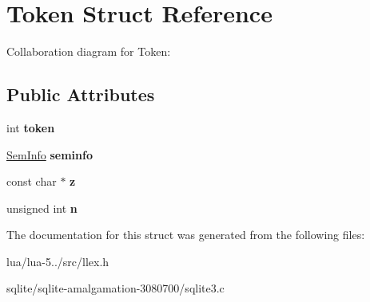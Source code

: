 \hypertarget{struct_token}{\section{Token Struct Reference}
\label{struct_token}
}


Collaboration diagram for Token\+:
\subsection*{Public Attributes}
\begin{DoxyCompactItemize}
\item 
\hypertarget{struct_token_a92d1dfeae343659449f1bc29d6731c5d}{int {\bfseries token}}\label{struct_token_a92d1dfeae343659449f1bc29d6731c5d}

\item 
\hypertarget{struct_token_a87067a25b1e511befc45d56cf535ef59}{\hyperlink{union_sem_info}{Sem\+Info} {\bfseries seminfo}}\label{struct_token_a87067a25b1e511befc45d56cf535ef59}

\item 
\hypertarget{struct_token_a57b502141e3018e4a02773424acb4ffd}{const char $\ast$ {\bfseries z}}\label{struct_token_a57b502141e3018e4a02773424acb4ffd}

\item 
\hypertarget{struct_token_ad8442439e00ab9713a9b91a53e44c2aa}{unsigned int {\bfseries n}}\label{struct_token_ad8442439e00ab9713a9b91a53e44c2aa}

\end{DoxyCompactItemize}


The documentation for this struct was generated from the following files\+:\begin{DoxyCompactItemize}
\item 
lua/lua-\/5../src/llex.\+h\item 
sqlite/sqlite-\/amalgamation-\/3080700/sqlite3.\+c\end{DoxyCompactItemize}
